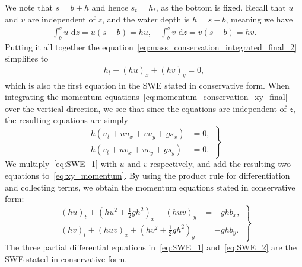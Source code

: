 We note that $s = b + h$ and hence $s_t = h_t$, as the bottom is fixed.
Recall that $u$ and $v$ are independent of $z$, and the water depth is $h = s - b$, meaning we have
\begin{align*}
    \int_{b}^{s} u \text{ d} z = u(s - b) = hu, \quad \int_{b}^{s} v \text{ d} z = v(s - b) = hv.
\end{align*}
Putting it all together the equation~\eqref{eq:mass_conservation_integrated_final_2} simplifies to
\begin{align}\label{eq:SWE_1}
    h_t + {(hu)}_x + {(hv)}_y = 0,
\end{align}
which is also the first equation in the SWE stated in conservative form.
When integrating the momentum equations~\eqref{eq:momentum_conservation_xy_final} over the vertical direction, we see that since the equations are independent of $z$, the resulting equations are simply
\begin{equation}\label{eq:xy_momentum}
    \left.
    \begin{aligned}
        h(u_t + uu_x + vu_y + g s_x) &= 0,\\
        h(v_t + uv_x + vv_y + g s_y) &= 0.
    \end{aligned}
    \right\}
\end{equation}
We multiply~\eqref{eq:SWE_1} with $u$ and $v$ respectively, and add the resulting two equations to~\eqref{eq:xy_momentum}.
By using the product rule for differentiation and collecting terms, we obtain the momentum equations stated in conservative form:
\begin{equation}\label{eq:SWE_2}
    \left.
    \begin{aligned}
        {(hu)}_t + {(hu^2 + \frac{1}{2}gh^2)}_x + {(huv)}_y &= -gh b_x,\\
        {(hv)}_t + {(huv)}_x + {(hv^2 + \frac{1}{2}gh^2)}_y &= -gh b_y.
    \end{aligned}
    \right\}
\end{equation}
The three partial differential equations in~\eqref{eq:SWE_1} and~\eqref{eq:SWE_2} are the SWE stated in conservative form.

